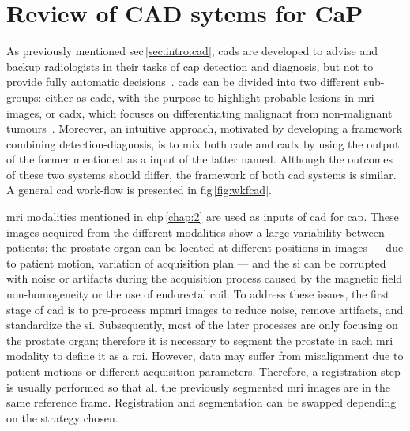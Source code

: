 \chapter{Review of CAD sytems for CaP}\label{chap:3}
\ifpdf
    \graphicspath{{3_review/figures/}}
\else
    \graphicspath{{3_review/figures/}}
\fi



As previously mentioned \acs{sec}\,\ref{sec:intro:cad}, \acp{cad} are developed to advise and backup radiologists in their tasks of \ac{cap} detection and diagnosis, but not to provide fully automatic decisions~\cite{Giger2008}.
\acp{cad} can be divided into two different sub-groups: either as \ac{cade}, with the purpose to highlight probable lesions in \ac{mri} images, or \ac{cadx}, which focuses on differentiating malignant from non-malignant tumours~\cite{Giger2008}.
Moreover, an intuitive approach, motivated by developing a framework combining detection-diagnosis, is to mix both \ac{cade} and \ac{cadx} by using the output of the former mentioned as a input of the latter named.
Although the outcomes of these two systems should differ, the framework of both \ac{cad} systems is similar.
A general \ac{cad} work-flow is presented in \acs{fig}\,\ref{fig:wkfcad}.

\ac{mri} modalities mentioned in \acs{chp}\,\ref{chap:2} are used as inputs of \ac{cad} for \ac{cap}.
These images acquired from the different modalities show a large variability between patients: the prostate organ can be located at different positions in images --- due to patient motion, variation of acquisition plan --- and the \ac{si} can be corrupted with noise or artifacts during the acquisition process caused by the magnetic field non-homogeneity or the use of endorectal coil.
To address these issues, the first stage of \ac{cad} is to pre-process \ac{mpmri} images to reduce noise, remove artifacts, and standardize the \ac{si}.
Subsequently, most of the later processes are only focusing on the prostate organ; therefore it is necessary to segment the prostate in each \ac{mri} modality to define it as a \ac{roi}.
However, data may suffer from misalignment due to patient motions or different acquisition parameters.
Therefore, a registration step is usually performed so that all the previously segmented \ac{mri} images are in the same reference frame.
Registration and segmentation can be swapped depending on the strategy chosen.

